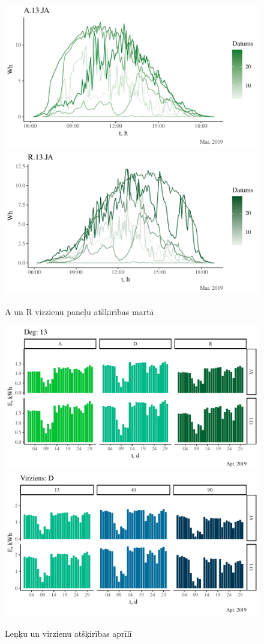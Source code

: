 \begin{figure}[h]
    \centering
    \includegraphics[width=\linewidth]{figures/sol_day/mar_A13JA.pdf}
    \includegraphics[width=\linewidth]{figures/sol_day/mar_R13JA.pdf}
    \caption{A un R virzienu paneļu atšķirības martā}
    \label{fig:mar_ar}
\end{figure}

\begin{figure}[h]
    \centering
    \includegraphics[width=\linewidth]{figures/sol_month/apr_Dir_d.pdf}
    \includegraphics[width=\linewidth]{figures/sol_month/apr_Deg_d.pdf}
    \caption{Leņķu un virzienu atšķirības aprīlī}
    \label{fig:mar_degDir}
\end{figure}